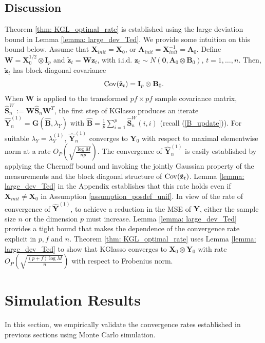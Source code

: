 \documentclass[journal,11pt,draftcls,onecolumn]{IEEEtran}
\def\Cov{{\rm Cov}}
\def\bA{ {\mathbf{A}} }
\def\bB{ {\mathbf{B}} }
\def\bG{ {\mathbf{G}} }
\def\bI{ {\mathbf{I}} }
\def\bS{ {\mathbf{S}} }
\def\bW{ {\mathbf{W}} }
\def\bX{ {\mathbf{X}} }
\def\bY{ {\mathbf{Y}} }
\def\bz{{ \mathbf{z}  }}
\begin{document}
\subsection{Discussion}
Theorem \ref{thm: KGL_optimal_rate} is established using the large deviation bound in Lemma \ref{lemma: large_dev_Ted}. We provide some intuition on this bound below.
Assume that $\bX_{init} = \bX_0$, or $\bA_{init}=\bX_{init}^{-1}=\bA_0$. Define $\bW= \bX_0^{1/2} \otimes \bI_p$ and $\tilde{\bz}_t = \bW \bz_t$, with i.i.d. $\bz_t\sim N(\mathbf{0}, \bA_0\otimes \bB_0)$, $t=1,\dots,n$. Then, $\tilde{\bz}_t$ has block-diagonal covariance
\begin{equation*}
	\Cov(\tilde{\bz}_t) = \bI_p \otimes \bB_0.
\end{equation*}
When $\bW$ is applied to the transformed $pf\times pf$ sample covariance matrix, $\hat{\bS}_n^W := \bW \hat{\bS}_n \bW^T$, the first step of KGlasso produces an iterate $\hat{\bY}_n^{(1)}=\bG(\hat{\bB},\lambda_Y)$ with $\hat{\bB} = \frac{1}{p}\sum_{i=1}^p \hat{\bS}_n^W(i,i)$ (recall (\ref{B_update})). For suitable $\lambda_Y = \lambda_Y^{(1)}$, $\hat{\bY}_n^{(1)}$ converges to $\bY_0$ with respect to maximal elementwise norm at a rate $O_P\left( \sqrt{\frac{\log M}{np}} \right)$. The convergence of $\hat{\bY}_n^{(1)}$ is easily established by applying the Chernoff bound and invoking the jointly Gaussian property of the measurements and the block diagonal structure of $\Cov(\tilde{\bz}_t)$. Lemma \ref{lemma: large_dev_Ted} in the Appendix establishes that this rate holds even if $\bX_{init}\neq \bX_0$ in Assumption \ref{assumption_posdef_unif}. In view of the rate of convergence of $\hat{\bY}^{(1)}$, to achieve a reduction in the MSE of $\bY$, either the sample size $n$ or the dimension $p$ must increase. Lemma \ref{lemma: large_dev_Ted} provides a tight bound that makes the dependence of the convergence rate explicit in $p,f$ and $n$. Theorem \ref{thm: KGL_optimal_rate} uses Lemma \ref{lemma: large_dev_Ted} to show that KGlasso converges to $\bX_0\otimes \bY_0$ with rate $O_P\left( \sqrt{\frac{(p+f)\log M}{n}} \right)$ with respect to Frobenius norm.



\section{Simulation Results} \label{sec: simulations}

In this section, we empirically validate the convergence rates established in previous sections using Monte Carlo simulation. 
\end{document}
